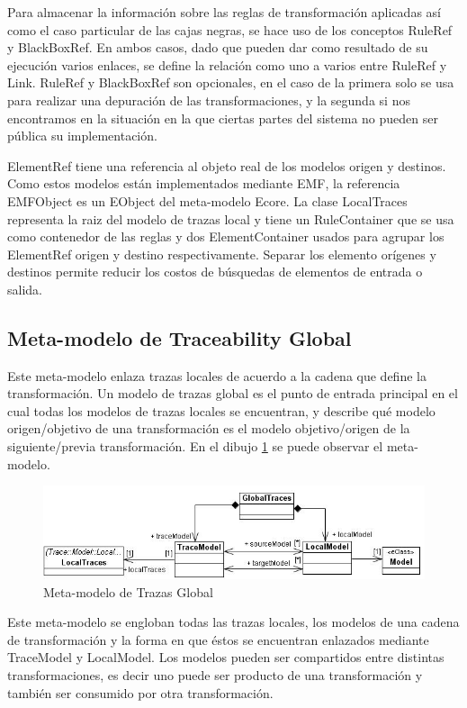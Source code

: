 \documentclass[a4paper,12pt,oneside]{book}
\begin{document}
Para almacenar la información sobre las reglas de transformación aplicadas así como el caso particular de las cajas negras, se hace uso de los conceptos RuleRef y BlackBoxRef. En ambos casos, dado que pueden dar como resultado de su ejecución varios enlaces, se define la relación como uno a varios entre RuleRef y Link. RuleRef y BlackBoxRef son opcionales, en el caso de la primera solo se usa para realizar una depuración de las transformaciones, y la segunda si nos encontramos en la situación en la que ciertas partes del sistema no pueden ser pública su implementación.

ElementRef tiene una referencia al objeto real de los modelos origen y destinos. Como estos modelos están implementados mediante EMF, la referencia EMFObject es un EObject del meta-modelo Ecore. La clase LocalTraces representa la raiz del modelo de trazas local y tiene un RuleContainer que se usa como contenedor de las reglas y dos ElementContainer usados para agrupar los ElementRef origen y destino respectivamente. Separar los elemento orígenes y destinos permite reducir los costos de búsquedas de elementos de entrada o salida.

\subsection{Meta-modelo de Traceability Global}

Este meta-modelo enlaza trazas locales de acuerdo a la cadena que define la transformación. Un modelo de trazas global es el punto de entrada principal en el cual todas los modelos de trazas locales se encuentran, y describe qué modelo origen/objetivo de una transformación es el modelo objetivo/origen de la siguiente/previa transformación. En el dibujo \ref{fig:GlobalTraceMetamodel} se puede observar el meta-modelo.

\begin{figure}[hbtp]
\centering
\includegraphics[scale=.6]{./img/GlobalTraceMetamodel}
\caption{Meta-modelo de Trazas Global}
\label{fig:GlobalTraceMetamodel}
\end{figure}

Este meta-modelo se engloban todas las trazas locales, los modelos de una cadena de transformación y la forma en que éstos se encuentran enlazados mediante TraceModel y LocalModel. Los modelos pueden ser compartidos entre distintas transformaciones, es decir uno puede ser producto de una transformación y también ser consumido por otra transformación.
\end{document}
